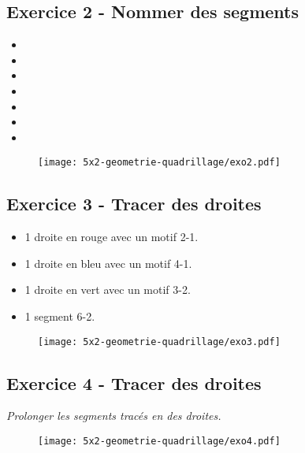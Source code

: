 \begin{minipage}[t]{0.25\textwidth}
  \subsection*{Exercice 2 - Nommer des segments}
  \begin{itemize}
    \item \dotfill
    \item \dotfill
    \item \dotfill
    \item \dotfill
    \item \dotfill
    \item \dotfill
    \item \dotfill
  \end{itemize}
  \end{minipage}
  \begin{minipage}[t]{0.75\textwidth}
\begin{figure}[H]
  \centering
  \texttt{[image: 5x2-geometrie-quadrillage/exo2.pdf]}
\end{figure}
\end{minipage}




\begin{minipage}[t]{0.25\textwidth}
\subsection*{Exercice 3 - Tracer des droites}
\begin{itemize}
  \item 1 droite en rouge avec un motif 2-1.
  \item 1 droite en bleu avec un motif 4-1.
  \item 1 droite en vert avec un motif 3-2.
  \item 1 segment 6-2.
\end{itemize}
\end{minipage}
\begin{minipage}[t]{0.75\textwidth}
  \begin{figure}[H]
    \centering
    \texttt{[image: 5x2-geometrie-quadrillage/exo3.pdf]}
  \end{figure}
\end{minipage}

\begin{minipage}[t]{0.25\textwidth}
\subsection*{Exercice 4 - Tracer des droites}

\textit{Prolonger les segments tracés en des droites.}
\end{minipage}
\begin{minipage}[t]{0.75\textwidth}
\begin{figure}[H]
  \centering
  \texttt{[image: 5x2-geometrie-quadrillage/exo4.pdf]}
\end{figure}
\end{minipage}
